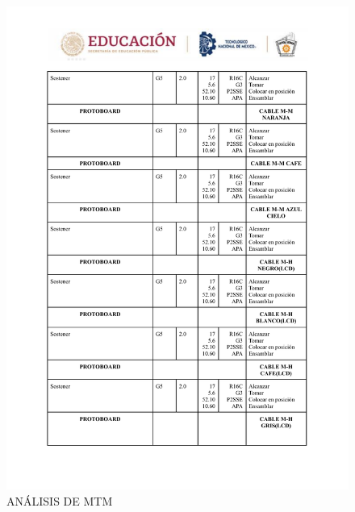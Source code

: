     \begin{figure}
        \centering
    \includegraphics[trim = {0mm 0mm 0mm 0mm},clip,scale=0.3]{24/Img/analisisMTM3.pdf}
    \caption{ANÁLISIS DE MTM}
        \label{analisis3}
    \end{figure}
